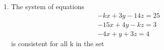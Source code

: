 \documentclass[journal,,12pt,onecolumn]{IEEEtran}
\theoremstyle{remark}
\begin{document}
\begin{enumerate}
        \begin{enumerate}
        \end{enumerate}
        \bigskip
    \item The system of equations
    \begin{align*}
        -kx+3y-14z=25\\
        -15x+4y-kz=3\\
        -4x+y+3z=4
    \end{align*}
    is consistent for all k in the set 
    \begin{enumerate}
        \end{enumerate}
\bigskip
 

\end{enumerate}
\end{document}
